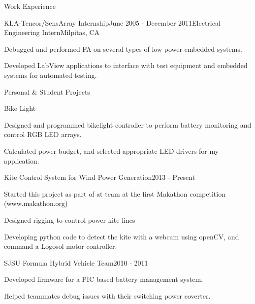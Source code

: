 \documentclass{resume} %
\begin{document}
\begin{rSection}{Work Experience}
\pagebreak[2]
\begin{rSubsection}{KLA-Tencor/SensArray Internship}{June 2005 - December 2011}{Electrical Engineering Intern}{Milpitas, CA}
\item Debugged and performed FA on several types of low power embedded systems. 
\item Developed LabView applications to interface with test equipment and embedded systems for automated testing.
\end{rSubsection}
\end{rSection}

\pagebreak[3]
\begin{rSection}{Personal \& Student Projects}
\vspace{-0.5em}
\begin{rProject}{Bike Light}{}
\item Designed and programmed bikelight controller to perform battery monitoring and control RGB LED arrays.
\item Calculated power budget, and selected appropriate LED drivers for my application.
\end{rProject}
\vspace{-0.5em}

\begin{rProject}{Kite Control System for Wind Power Generation}{2013 - Present}
\item Started this project as part of at team at the first Makathon competition (www.makathon.org)
\item Designed rigging to control power kite lines 
\item Developing python code to detect the kite with a webcam using openCV, and command a Logosol motor controller.
\end{rProject}
\vspace{-0.5em}

\begin{rProject}{SJSU Formula Hybrid Vehicle Team}{2010 - 2011}
\item Developed firmware for a PIC based battery management system.
\item Helped teammates debug issues with their switching power coverter.
\end{rProject}
\end{rSection}
\end{document}
